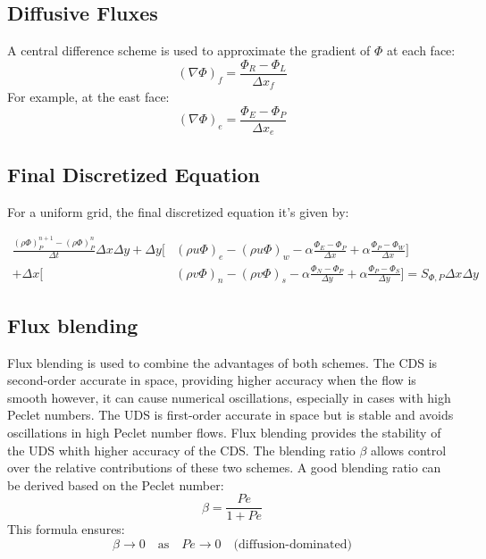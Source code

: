 \documentclass{article}
\begin{document}
\subsection*{Diffusive Fluxes}

A central difference scheme is used to approximate the gradient of $\Phi$ at each face:
\begin{equation}
(\nabla \Phi)_f = \frac{\Phi_R - \Phi_L}{\Delta x_f}
\end{equation}
For example, at the east face:
\begin{equation}
(\nabla \Phi)_e = \frac{\Phi_E - \Phi_P}{\Delta x_e}
\end{equation}

\subsection{Final Discretized Equation}

For a uniform grid, the final discretized equation it's given by:

\begin{align*}
\frac{(\rho \Phi)_P^{n+1} - (\rho \Phi)_P^n}{\Delta t} \Delta x \Delta y + \Delta y \Bigg[ & (\rho u \Phi)_e - (\rho u \Phi)_w - \alpha \frac{\Phi_E - \Phi_P}{\Delta x} + \alpha \frac{\Phi_P - \Phi_W}{\Delta x} \Bigg] \\
+ \Delta x \Bigg[ & (\rho v \Phi)_n - (\rho v \Phi)_s - \alpha \frac{\Phi_N - \Phi_P}{\Delta y} + \alpha \frac{\Phi_P - \Phi_S}{\Delta y} \Bigg] = S_{\Phi, P} \Delta x \Delta y
\end{align*}

\subsection{Flux blending}

Flux blending is used to combine the advantages of both schemes. The CDS is second-order accurate in space, providing higher accuracy when the
flow is smooth however, it can cause numerical oscillations, especially in cases with high Peclet numbers. The UDS is first-order 
accurate in space but is stable and avoids oscillations in high Peclet number flows. Flux blending provides the stability of the UDS whith higher 
accuracy of the CDS. The blending ratio $\beta$ allows control over the relative contributions of these two schemes. A good blending ratio can be derived 
based on the Peclet number:
\[
\beta = \frac{Pe}{1 + Pe}
\]
This formula ensures:
\[
\beta \to 0 \quad \text{as} \quad Pe \to 0 \quad \text{(diffusion-dominated)}
\]
\end{document}
